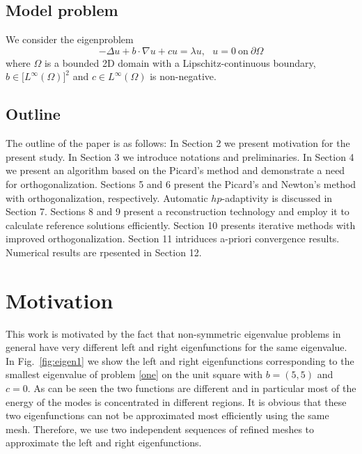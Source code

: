 \documentclass[smallextended]{svjour3}
\begin{document}
\subsection{Model problem}

We consider the eigenproblem
\begin{equation} \label{one}
-\Delta u + b\cdot\nabla u + cu = \lambda u, \ \ \ u = 0 \ \mbox{on} \ \partial \Omega
\end{equation}
where $\Omega$ is a bounded 2D domain with a Lipschitz-continuous boundary,
$b \in \big[L^\infty(\Omega)\big]^2$ and $c\in L^\infty(\Omega)$ is non-negative.


\subsection{Outline}

The outline of the paper is as follows: In Section 2 we present motivation 
for the present study. In Section 3 we introduce notations and preliminaries. 
In Section 4 we present an algorithm based on the Picard's method and demonstrate 
a need for orthogonalization. Sections 5 and 6 present the Picard's and Newton's
method with orthogonalization, respectively. Automatic $hp$-adaptivity is discussed in 
Section 7. Sections 8 and 9 present a reconstruction technology and employ it to 
calculate reference solutions efficiently. Section 10 presents iterative methods 
with improved orthogonalization. Section 11 intriduces a-priori convergence results. 
Numerical results are rpesented in Section 12.



\section{Motivation}\label{sec:motiv}

This work is motivated by the fact that non-symmetric eigenvalue problems in general have very different left and right eigenfunctions for the same eigenvalue.
In Fig.~\ref{fig:eigen1} we show the left and right eigenfunctions corresponding to the smallest eigenvalue of problem \eqref{one} on the unit square with $b = (5, 5)$ and $c=0$. 
As can be seen the two functions are different and in particular most of the energy of the modes is concentrated in different regions. It is obvious that these two eigenfunctions can not be approximated most efficiently using the same mesh. Therefore, we use two independent sequences of refined meshes to approximate the left and right eigenfunctions.
\end{document}
